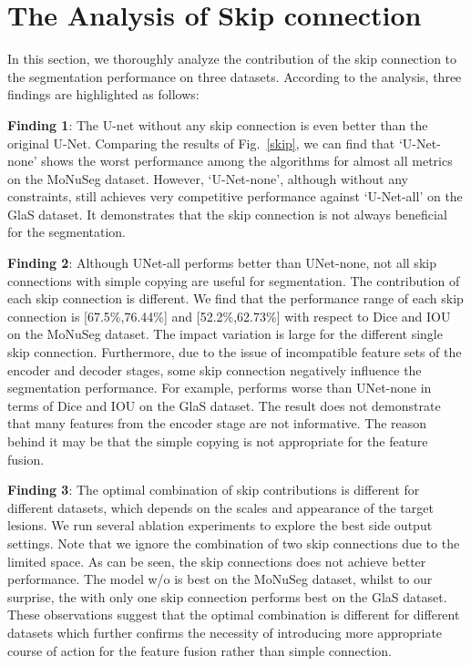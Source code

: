 \documentclass[letterpaper]{article} \usepackage{aaai22}  \usepackage{times}  \usepackage{helvet}  \usepackage{courier}  \usepackage[hyphens]{url}  \usepackage{graphicx} \urlstyle{rm} \def\UrlFont{\rm}  \usepackage{natbib}  \usepackage{caption} \DeclareCaptionStyle{ruled}{labelfont=normalfont,labelsep=colon,strut=off} \frenchspacing  \setlength{\pdfpagewidth}{8.5in}  \setlength{\pdfpageheight}{11in}  \usepackage{algorithm}
\begin{document}
	\section{The Analysis of Skip connection } 
	\label{section:analysis}
	
	In this section, we thoroughly analyze the contribution of the skip connection to the segmentation performance on three datasets.  According to the analysis, three findings are highlighted as follows:
	
	\textbf{Finding 1}: The U-net without any skip connection is even better than the original U-Net.
	Comparing the results of Fig.~\ref{skip}, we can find that `U-Net-none' shows the worst performance among the algorithms for almost all metrics on the MoNuSeg dataset. However, `U-Net-none', although without any constraints, still achieves very competitive performance against `U-Net-all' on the GlaS dataset. 
	It demonstrates that the skip connection is not always beneficial for the segmentation.
	
	\textbf{Finding 2}: Although UNet-all performs better than UNet-none, not all skip connections with simple copying are useful for segmentation. The contribution of each skip connection is different.
	We find that the performance range of each skip connection  is [67.5\%,76.44\%] and [52.2\%,62.73\%] with respect to Dice and IOU on  the MoNuSeg dataset. The impact variation is large for the different single skip connection. Furthermore, due to the issue of incompatible feature sets of the encoder and decoder stages, some skip connection negatively influence the segmentation performance. For example,   performs worse than UNet-none in terms of Dice and IOU on the GlaS dataset.
	The result does not demonstrate that many features from the encoder stage are not informative. The reason behind it may be that the simple  copying is not appropriate for the feature fusion.
	
	\textbf{Finding 3}: The optimal combination of skip contributions is different for different datasets, which depends on the scales and appearance of the target lesions.
	We run several ablation experiments to explore the best side output settings. Note that we ignore the combination of two skip connections due to the limited space. As can be seen, the skip connections does not achieve better performance.
	The model w/o  is best on the MoNuSeg dataset, whilst to our surprise, the   with only one skip connection performs best on the GlaS dataset. 
	These observations suggest that the optimal combination is different for different datasets which further confirms the necessity of introducing more appropriate course of action for the feature fusion rather than simple connection.
	
\end{document}
